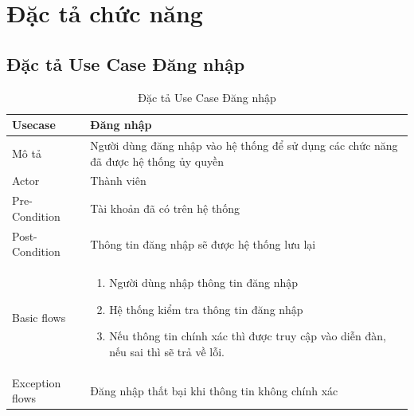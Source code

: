 \documentclass[../index.tex]{subfiles}
\begin{document}
    \section{Đặc tả chức năng}

    \subsection{Đặc tả Use Case Đăng nhập}
    \begin{table}[H]
        \centering
        {}
        \begin{tabular}{ |p{3cm}|p{9cm}| }
            \hline
            Usecase         & Đăng nhập                                                                                   \\
            \hline
            Mô tả           & Người dùng đăng nhập vào hệ thống để sử dụng các chức năng đã được hệ thống ủy quyền        \\
            \hline
            Actor           & Thành viên                                                                                  \\
            \hline
            Pre-Condition   & Tài khoản đã có trên hệ thống                                                               \\
            \hline
            Post-Condition  & Thông tin đăng nhập sẽ được hệ thống lưu lại                                                \\
            \hline
            Basic flows     & \begin{enumerate}
                \item Người dùng nhập thông tin đăng nhập
                \item Hệ thống kiểm tra thông tin đăng nhập
                \item Nếu thông tin chính xác thì được truy cập vào diễn đàn, nếu sai thì sẽ trả về lỗi.
            \end{enumerate} \\
            \hline
            Exception flows & Đăng nhập thất bại khi thông tin không chính xác                                            \\
            \hline
        \end{tabular}
        \caption{Đặc tả Use Case Đăng nhập}
    \end{table}
\end{document}
